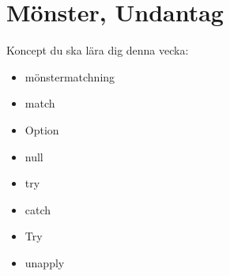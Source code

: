 \chapter{Mönster, Undantag}\label{chapter:W08}
Koncept du ska lära dig denna vecka:
\begin{multicols}{2}\begin{itemize}[nosep,label={$\square$},leftmargin=*]
\item mönstermatchning
\item match
\item Option
\item null
\item try
\item catch
\item Try
\item unapply\end{itemize}\end{multicols}
